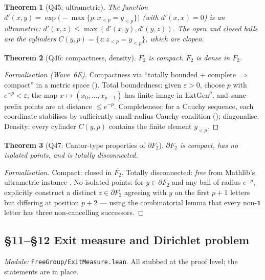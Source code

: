 \documentclass[11pt,a4paper]{article}
\newcommand{\lmod}[1]{\texttt{\small #1}}
\newcommand{\BFG}{\partial F_2}
\newcommand{\cpt}{\overline{F_2}}
\theoremstyle{plain}
\newtheorem{theorem}{Theorem}[section]
\theoremstyle{definition}
\begin{document}
\begin{theorem}[Q45: ultrametric]
The function
$d'(x, y) = \exp\bigl(-\max\{p : x_{<p} = y_{<p}\}\bigr)$ (with
$d'(x, x) = 0$) is an ultrametric:
$d'(x, z) \leq \max(d'(x, y), d'(y, z))$. The open and closed balls
are the cylinders $C(y, p) = \{z : z_{<p} = y_{<p}\}$, which are clopen.
\end{theorem}

\begin{theorem}[Q46: compactness, density]
$\cpt$ is compact. $F_2$ is dense in $\cpt$.
\end{theorem}

\begin{proof}[Formalisation (Wave~6E)]
Compactness via ``totally bounded + complete $\Rightarrow$ compact'' in a
metric space ().
Total boundedness: given $\varepsilon > 0$, choose $p$ with $e^{-p} < \varepsilon$; the map
$x \mapsto (x_0, \ldots, x_{p-1})$ has finite image in
$\text{ExtGen}^p$, and same-prefix points are at distance $\leq e^{-p}$.
Completeness: for a Cauchy sequence, each coordinate stabilises by
sufficiently small-radius Cauchy condition
(); diagonalise.
Density: every cylinder $C(y, p)$ contains the finite element $y_{<p}$.
\end{proof}

\begin{theorem}[Q47: Cantor-type properties of $\BFG$]
$\BFG$ is compact, has no isolated points, and is totally disconnected.
\end{theorem}

\begin{proof}[Formalisation]
Compact: closed in $\cpt$. Totally disconnected: \emph{free} from
Mathlib's ultrametric instance
.
No isolated points: for $y \in \BFG$ and any ball of radius $e^{-p}$,
explicitly construct a distinct $z \in \BFG$ agreeing with $y$ on the
first $p+1$ letters but differing at position $p+2$ --- using the
combinatorial lemma  that every
non-$\mathbf 1$ letter has three non-cancelling successors.
\end{proof}

\subsection{\S11--\S12 Exit measure and Dirichlet problem}
\emph{Module:} \lmod{FreeGroup/ExitMeasure.lean}. All stubbed at the
proof level; the statements are in place.
\end{document}
